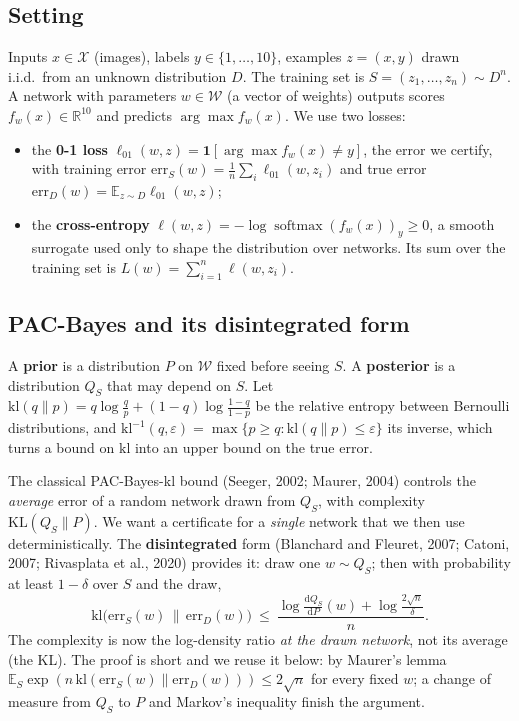 \documentclass[11pt]{article}
\theoremstyle{definition}
\theoremstyle{remark}
\newcommand{\E}{\mathbb{E}}
\newcommand{\KL}{\mathrm{KL}}
\newcommand{\kl}{\mathrm{kl}}
\newcommand{\err}{\mathrm{err}}
\newcommand{\R}{\mathbb{R}}
\newcommand{\dd}{\mathrm{d}}
\begin{document}
\subsection{Setting}
Inputs $x\in\mathcal{X}$ (images), labels $y\in\{1,\dots,10\}$, examples $z=(x,y)$ drawn i.i.d.\ from an unknown
distribution $D$. The training set is $S=(z_1,\dots,z_n)\sim D^n$. A network with parameters $w\in\mathcal{W}$ (a vector
of weights) outputs scores $f_w(x)\in\R^{10}$ and predicts $\arg\max f_w(x)$. We use two losses:
\begin{itemize}[nosep]
\item the \textbf{0-1 loss} $\ell_{01}(w,z)=\mathbf{1}[\arg\max f_w(x)\neq y]$, the error we certify, with training error
  $\err_S(w)=\frac1n\sum_i\ell_{01}(w,z_i)$ and true error $\err_D(w)=\E_{z\sim D}\ell_{01}(w,z)$;
\item the \textbf{cross-entropy} $\ell(w,z)=-\log\operatorname{softmax}(f_w(x))_y\ge0$, a smooth surrogate used only to
  shape the distribution over networks. Its sum over the training set is $L(w)=\sum_{i=1}^n\ell(w,z_i)$.
\end{itemize}

\subsection{PAC-Bayes and its disintegrated form}\label{sec:pacbayes}
A \textbf{prior} is a distribution $P$ on $\mathcal{W}$ fixed before seeing $S$. A \textbf{posterior} is a distribution
$Q_S$ that may depend on $S$. Let $\kl(q\|p)=q\log\frac qp+(1-q)\log\frac{1-q}{1-p}$ be the relative entropy between
Bernoulli distributions, and $\kl^{-1}(q,\varepsilon)=\max\{p\ge q:\kl(q\|p)\le\varepsilon\}$ its inverse, which turns a
bound on $\kl$ into an upper bound on the true error.

The classical PAC-Bayes-kl bound (Seeger, 2002; Maurer, 2004) controls the \emph{average} error of a random network drawn
from $Q_S$, with complexity $\KL(Q_S\|P)$. We want a certificate for a \emph{single} network that we then use
deterministically. The \textbf{disintegrated} form (Blanchard and Fleuret, 2007; Catoni, 2007; Rivasplata et al., 2020)
provides it: draw one $w\sim Q_S$; then with probability at least $1-\delta$ over $S$ and the draw,
\begin{equation}\label{eq:disint}
\kl\big(\err_S(w)\,\|\,\err_D(w)\big)\ \le\ \frac{\log\frac{\dd Q_S}{\dd P}(w)+\log\frac{2\sqrt n}{\delta}}{n}.
\end{equation}
The complexity is now the log-density ratio \emph{at the drawn network}, not its average (the KL). The proof is short and
we reuse it below: by Maurer's lemma $\E_S\exp(n\,\kl(\err_S(w)\|\err_D(w)))\le2\sqrt n$ for every fixed $w$; a change of
measure from $Q_S$ to $P$ and Markov's inequality finish the argument.
\end{document}
